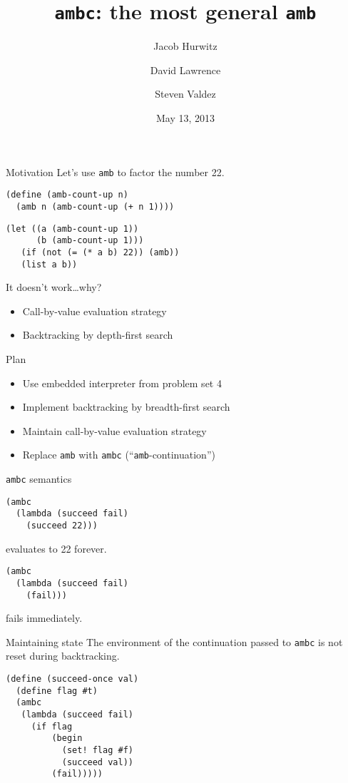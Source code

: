 \documentclass[14pt]{beamer}
\title{\texttt{ambc}: the most general \texttt{amb}}
\author[dlaw, dvorak42, jhurwitz]
  {Jacob Hurwitz \and David Lawrence \and Steven Valdez}
\date{May 13, 2013}
\begin{document}
\titlepage

\begin{frame}[fragile]{Motivation}
 Let's use \texttt{amb} to factor the number 22.

\begin{lstlisting}
(define (amb-count-up n)
  (amb n (amb-count-up (+ n 1))))
\end{lstlisting}
\begin{lstlisting}
(let ((a (amb-count-up 1))
      (b (amb-count-up 1)))
   (if (not (= (* a b) 22)) (amb))
   (list a b))
\end{lstlisting}

\pause

It doesn't work\ldots why?

\pause

  \begin{itemize}
  \item Call-by-value evaluation strategy
    \pause
  \item Backtracking by depth-first search
  \end{itemize}
\end{frame}

\begin{frame}[fragile]{Plan}
  \begin{itemize}
  \item Use embedded interpreter from problem set 4
    \pause
  \item Implement backtracking by breadth-first search
    \pause
  \item Maintain call-by-value evaluation strategy
    \pause
  \item Replace \texttt{amb} with \texttt{ambc} (``\texttt{amb}-continuation'')
  \end{itemize}
\end{frame}

\begin{frame}[fragile]{\texttt{ambc} semantics}
\begin{lstlisting}
(ambc
  (lambda (succeed fail)
    (succeed 22)))
\end{lstlisting}
evaluates to 22 forever.

\vfill

\begin{lstlisting}
(ambc
  (lambda (succeed fail)
    (fail)))
\end{lstlisting}
fails immediately.
\end{frame}

\begin{frame}[fragile]{Maintaining state}
  The environment of the continuation passed to \texttt{ambc} is not
  reset during backtracking.
  \begin{lstlisting}
(define (succeed-once val)
  (define flag #t)
  (ambc
   (lambda (succeed fail)
     (if flag
         (begin
           (set! flag #f)
           (succeed val))
         (fail)))))
  \end{lstlisting}
\end{frame}
\end{document}
